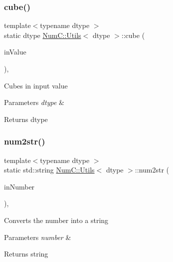 \subsubsection{\texorpdfstring{cube()}{cube()}}
{\footnotesize\ttfamily template$<$typename dtype $>$ \\
static dtype \mbox{\hyperlink{class_num_c_1_1_utils}{Num\+C\+::\+Utils}}$<$ dtype $>$\+::cube (\begin{DoxyParamCaption}\item[{dtype}]{in\+Value }\end{DoxyParamCaption})\hspace{0.3cm}{\ttfamily [inline]}, {\ttfamily [static]}}

Cubes in input value


\begin{DoxyParams}{Parameters}
{\em dtype} & \\
\hline
\end{DoxyParams}
\begin{DoxyReturn}{Returns}
dtype 
\end{DoxyReturn}
\mbox{\label{class_num_c_1_1_utils_a74afc2e3bb44cf816b45db1e0e5a726b}} 
\subsubsection{\texorpdfstring{num2str()}{num2str()}}
{\footnotesize\ttfamily template$<$typename dtype $>$ \\
static std\+::string \mbox{\hyperlink{class_num_c_1_1_utils}{Num\+C\+::\+Utils}}$<$ dtype $>$\+::num2str (\begin{DoxyParamCaption}\item[{dtype}]{in\+Number }\end{DoxyParamCaption})\hspace{0.3cm}{\ttfamily [inline]}, {\ttfamily [static]}}

Converts the number into a string


\begin{DoxyParams}{Parameters}
{\em number} & \\
\hline
\end{DoxyParams}
\begin{DoxyReturn}{Returns}
string 
\end{DoxyReturn}
\mbox{\label{class_num_c_1_1_utils_a15993a5fe899240616150c862e39be20}} 
